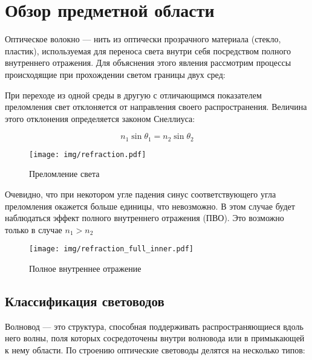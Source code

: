 \chapter{Обзор предметной области}
Оптическое волокно — нить из оптически прозрачного материала (стекло, пластик), используемая для переноса света внутри себя посредством полного внутреннего отражения. Для объяснения этого явления рассмотрим процессы происходящие при прохождении светом границы двух сред:

При переходе из одной среды в другую с отличающимся показателем преломления свет отклоняется от направления своего распространения. Величина этого отклонения определяется законом Снеллиуса:

\begin{equation}
 n_1 \sin\theta_1 = n_2 \sin\theta_2
\end{equation}

\begin{figure}[h!]
\texttt{[image: img/refraction.pdf]}
\caption{Преломление света}
\end{figure}

Очевидно, что при некотором угле падения синус соответствующего угла преломления окажется больше единицы, что невозможно. В этом случае будет наблюдаться эффект полного внутреннего отражения (ПВО). Это возможно только в случае $n_1 > n_2$

\begin{figure}[h!]
\texttt{[image: img/refraction\_full\_inner.pdf]}
\caption{Полное внутреннее отражение}
\end{figure}

\section{Классификация световодов}
Волновод — это структура, способная поддерживать распространяющиеся вдоль него волны, поля которых сосредоточены внутри волновода или в примыкающей к нему области. По строению оптические световоды делятся на несколько типов:

